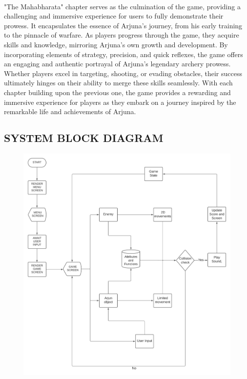 \\
"The Mahabharata" chapter serves as the culmination of the game, providing a challenging and immersive experience for users to fully demonstrate their prowess. It encapsulates the essence of Arjuna's journey, from his early training to the pinnacle of warfare. As players progress through the game, they acquire skills and knowledge, mirroring Arjuna's own growth and development. By incorporating elements of strategy, precision, and quick reflexes, the game offers an engaging and authentic portrayal of Arjuna's legendary archery prowess. Whether players excel in targeting, shooting, or evading obstacles, their success ultimately hinges on their ability to merge these skills seamlessly. With each chapter building upon the previous one, the game provides a rewarding and immersive experience for players as they embark on a journey inspired by the remarkable life and achievements of Arjuna.


\pagebreak
\subsection{SYSTEM BLOCK DIAGRAM}
\vspace{2cm}
\begin{figure}[h]
	
	\centering
	\includegraphics[width = 1.1\textwidth]{sec/pdf/img}

\end{figure}
